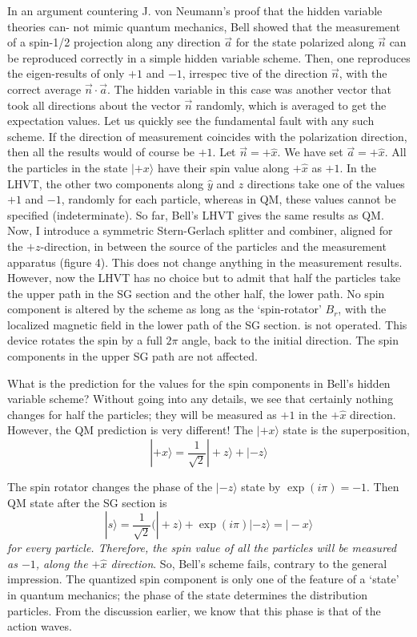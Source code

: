 In an argument countering J. von Neumann's proof that the hidden variable theories can-
not mimic quantum mechanics, Bell showed that the measurement of a spin-1/2 projection
along any direction $\vec{a}$ for the state polarized along $\vec{n}$ can be reproduced correctly in a simple
hidden variable scheme. Then, one reproduces the eigen-results of only $+1$ and $-1$, irrespec
tive of the direction $\vec{n}$, with the correct average $\vec{n} \cdot \vec{a}$.
 The hidden variable in this case was another vector that took all directions about the vector $\vec{n}$ randomly, which is averaged to
get the expectation values. Let us quickly see the fundamental fault with any such scheme.
If the direction of measurement coincides with the polarization direction, then all the results
would of course be $+1$. Let $\vec{n} = + \hat{x}$. We have set $\vec{a} = + \hat{x}$. All the particles in the state
$|+x \rangle $ have their spin value along $+ \hat{x}$ as $+1$. In the LHVT, the other two components along
$\hat{y}$ and $\hat{z}$ directions take one of the values $+1$ and $-1$, randomly for each particle, whereas in
QM, these values cannot be specified (indeterminate). So far, Bell's LHVT gives the same
results as QM. Now, I introduce a symmetric Stern-Gerlach splitter and combiner, aligned
for the $+z$-direction, in between the source of the particles and the measurement apparatus
(figure 4). This does not change anything in the measurement results. However, now the
LHVT has no choice but to admit that half the particles take the upper path in the SG
section and the other half, the lower path. No spin component is altered by the scheme as
long as the `spin-rotator' $B_r$, with the localized magnetic field in the lower path of the SG
section. is not operated. This device rotates the spin by a full $2\pi$ angle, back to the initial
direction. The spin components in the upper SG path are not affected.

What is the prediction for the values for the spin components in Bell's hidden variable
scheme? Without going into any details, we see that certainly nothing changes for half the
particles; they will be measured as $+1$ in the $+ \hat{x}$ direction. However, the QM prediction is
very different! The $|+x \rangle$ state is the superposition,
\begin{equation*}
| + x \rangle = \frac{1}{\sqrt{2}} | + z\rangle + | - z \rangle \tag{42}\label{c14-eq42}
\end{equation*}

The spin rotator changes the phase of the $|-z \rangle$ state by $\exp(i \pi) = -1$. Then QM state after 
the SG section is
\begin{equation*}
|s \rangle = \frac{1}{\sqrt{2}} (|+z) + \exp (i \pi) | - z \rangle = | - x \rangle \tag{43}\label{c14-eq43}
\end{equation*}
\textit{for every particle. Therefore, the spin value of all the particles will be measured as $-1$, along
the $+ \hat{x}$ direction}. So, Bell's scheme fails, contrary to the general impression. The quantized
spin component is only one of the feature of a `state' in quantum mechanics; the phase of
the state determines the distribution particles. From the discussion earlier, we know that
this phase is that of the action waves.

